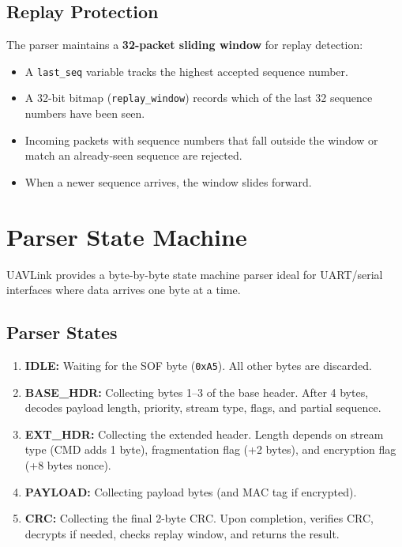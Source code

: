 \documentclass[11pt,a4paper]{article}
\begin{document}
\subsection{Replay Protection}

The parser maintains a \textbf{32-packet sliding window} for replay detection:
\begin{itemize}[noitemsep]
    \item A \texttt{last\_seq} variable tracks the highest accepted sequence number.
    \item A 32-bit bitmap (\texttt{replay\_window}) records which of the last 32 sequence numbers have been seen.
    \item Incoming packets with sequence numbers that fall outside the window or match an already-seen sequence are rejected.
    \item When a newer sequence arrives, the window slides forward.
\end{itemize}

\section{Parser State Machine}

UAVLink provides a byte-by-byte state machine parser ideal for UART/serial interfaces where data arrives one byte at a time.

\subsection{Parser States}

\begin{enumerate}[noitemsep]
    \item \textbf{IDLE:} Waiting for the SOF byte (\texttt{0xA5}). All other bytes are discarded.
    \item \textbf{BASE\_HDR:} Collecting bytes 1--3 of the base header. After 4 bytes, decodes payload length, priority, stream type, flags, and partial sequence.
    \item \textbf{EXT\_HDR:} Collecting the extended header. Length depends on stream type (CMD adds 1 byte), fragmentation flag (+2 bytes), and encryption flag (+8 bytes nonce).
    \item \textbf{PAYLOAD:} Collecting payload bytes (and MAC tag if encrypted).
    \item \textbf{CRC:} Collecting the final 2-byte CRC. Upon completion, verifies CRC, decrypts if needed, checks replay window, and returns the result.
\end{enumerate}
\end{document}
